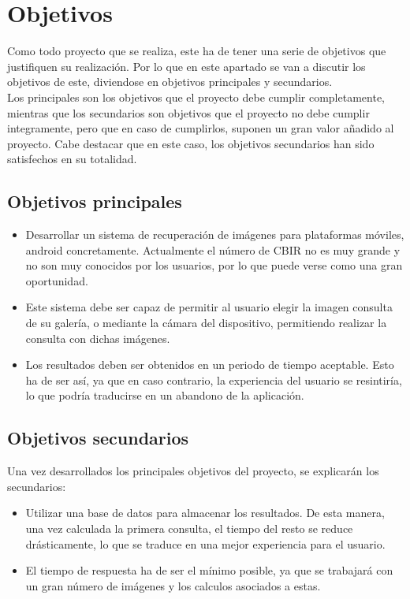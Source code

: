 \chapter{Objetivos}
\label{cap:objetivos}

Como todo proyecto que se realiza, este ha de tener una serie de objetivos que justifiquen su realización. Por lo que en este apartado se van a discutir los objetivos de este, diviendose en objetivos principales y secundarios.\\

Los principales son los objetivos que el proyecto debe cumplir completamente, mientras que los secundarios son objetivos que el proyecto no debe cumplir integramente, pero que en caso de cumplirlos, suponen un gran valor añadido al proyecto. Cabe destacar que en este caso, los objetivos secundarios han sido satisfechos en su totalidad.\\

\section{Objetivos principales}

\begin{itemize}
  \item Desarrollar un sistema de recuperación de imágenes para plataformas móviles, android concretamente. Actualmente el número de CBIR no es muy grande y no son muy conocidos por los usuarios, por lo que puede verse como una gran oportunidad.
  
  \item Este sistema debe ser capaz de permitir al usuario elegir la imagen consulta de su galería, o mediante la cámara del dispositivo, permitiendo realizar la consulta con dichas imágenes.
  
  \item Los resultados deben ser obtenidos en un periodo de tiempo aceptable. Esto ha de ser así, ya que en caso contrario, la experiencia del usuario se resintiría, lo que podría traducirse en un abandono de la aplicación.  
  
\end{itemize}


\section{Objetivos secundarios}

Una vez desarrollados los principales objetivos del proyecto, se explicarán los secundarios:

\begin{itemize}
  \item Utilizar una base de datos para almacenar los resultados. De esta manera, una vez calculada la primera consulta, el tiempo del resto se reduce drásticamente, lo que se traduce en una mejor experiencia para el usuario.

  \item El tiempo de respuesta ha de ser el mínimo posible, ya que se trabajará con un gran número de imágenes y los calculos asociados a estas.

\end{itemize}
